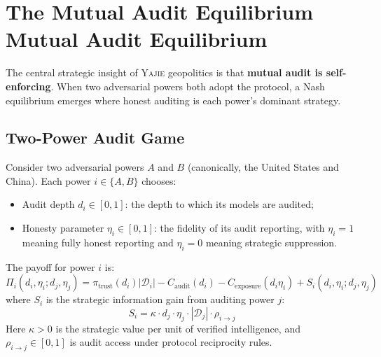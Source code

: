 \documentclass[11pt,a4paper]{article}
\theoremstyle{definition}
\theoremstyle{remark}
\newcommand{\Yajie}{\textsc{Yajie}}
\newcommand{\cD}{\mathcal{D}}
\newcommand{\trustPremium}{\pi_{\text{trust}}}
\begin{document}
\section{The Mutual Audit Equilibrium Mutual Audit Equilibrium}
\label{sec:equilibrium}
The central strategic insight of \Yajie{} geopolitics is that \textbf{mutual audit is self-enforcing}. When two adversarial powers both adopt the protocol, a Nash equilibrium emerges where honest auditing is each power's dominant strategy.
\subsection{Two-Power Audit Game}
Consider two adversarial powers $A$ and $B$ (canonically, the United States and China). Each power $i \in \{A, B\}$ chooses:
\begin{itemize}
    \item Audit depth $d_i \in [0,1]$: the depth to which its models are audited;
    \item Honesty parameter $\eta_i \in [0,1]$: the fidelity of its audit reporting, with $\eta_i = 1$ meaning fully honest reporting and $\eta_i = 0$ meaning strategic suppression.
\end{itemize}
The payoff for power $i$ is:
\begin{equation}
    \Pi_i(d_i, \eta_i; d_j, \eta_j) = \trustPremium(d_i) |\cD_i| - C_{\text{audit}}(d_i) - C_{\text{exposure}}(d_i \eta_i) + S_i(d_i, \eta_i; d_j, \eta_j)
    \label{eq:payoff}
\end{equation}
where $S_i$ is the strategic information gain from auditing power $j$:
\begin{equation}
    S_i = \kappa \cdot d_j \cdot \eta_j \cdot |\cD_j| \cdot \rho_{i \to j}
    \label{eq:strategic_gain}
\end{equation}
Here $\kappa > 0$ is the strategic value per unit of verified intelligence, and $\rho_{i \to j} \in [0,1]$ is audit access under protocol reciprocity rules.
\end{document}
